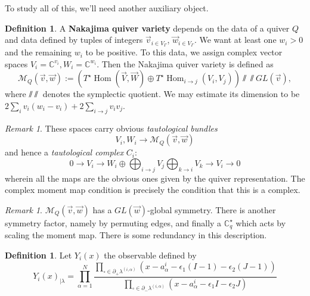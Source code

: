 \documentclass[leqno, openany]{memoir}
\theoremstyle{definition}
\newtheorem{defn}[thm]{Definition}
\theoremstyle{remark}
\newtheorem{rmk}[thm]{Remark}
\theoremstyle{plain}
\theoremstyle{definition}
\theoremstyle{remark}
\DeclareMathOperator{\Hom}{Hom}
\begin{document}
To study all of this, we'll need another auxiliary object.
\begin{defn}
  A \textbf{Nakajima quiver variety} depends on the data of a quiver $Q$ and data defined by tuples of integers $\vec{v}_{i \in V_\Gamma}$, $\vec{w}_{i \in V_\Gamma}$. 
  We want at least one $w_i > 0$ and the remaining $w_i$ to be positive. 
  To this data, we assign complex vector spaces $V_i = \mathbb{C}^{v_i}, W_i = \mathbb{C}^{w_i}$. 
  Then the Nakajima quiver variety is defined as
  \[
\mathcal{M}_Q(\vec{v},\vec{w}) := (T^\star \Hom(\vec{V},\vec{W}) \oplus T^\star \Hom_{i \to j}(V_i,V_j))\sslash\!\!\!\sslash GL(\vec{v}),
  \]
  where $\sslash\!\!\sslash$ denotes the symplectic quotient. 
  We may estimate its dimension to be $2 \sum_i v_i(w_i - v_i) + 2 \sum_{i \to j} v_i v_j$.
\end{defn}

\begin{rmk}
These spaces carry obvious \emph{tautological bundles} 
\[
V_i, W_i \to \mathcal{M}_Q(\vec{v},\vec{w})
\]
and hence a \emph{tautological complex} $C_i$:
\[
0 \to V_i \to W_i \oplus \bigoplus_{i \to j} V_j \bigoplus_{k \to i} V_k \to V_i \to 0
\]
wherein all the maps are the obvious ones given by the quiver representation. 
The complex moment map condition is precisely the condition that this is a complex.
\end{rmk}

\begin{rmk}
$\mathcal{M}_Q(\vec{v},\vec{w})$ has a $GL(\vec{w})$-global symmetry. 
There is another symmetry factor, namely by permuting edges, and finally a $\mathbb{C}^\star_q$ which
acts by scaling the moment map.
There is some redundancy in this description.
\end{rmk}

\begin{defn}
Let $Y_i(x)$ the observable defined by 
\[
Y_i(x)_{|\lambda} = \prod_{\alpha = 1}^N \frac{\prod_{\square \in \partial_+ \lambda^{(i,\alpha)}}(x - a_\alpha^i - \epsilon_1(I- 1) - \epsilon_2(J-1))}{\prod_{\square \in \partial_- \lambda^{(i,\alpha)}}(x - a_\alpha^i - \epsilon_1 I - \epsilon_2 J)}
\]
\end{defn} 
\end{document}

